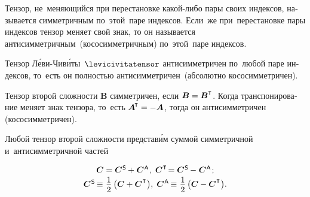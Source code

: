 \begin{otherlanguage}{russian}

Тензор, не~меняющийся при перестановке какой\hbox{-}либо пары своих индексов, называется симметричным по~этой~паре индексов. Если~же при~перестановке пары индексов тензор меняет свой знак, то он называется антисимметричным~(кососимметричным) по~этой~паре индексов.

Тензор Л\'{е}ви\hbox{-\!}Чив\'{и}ты~$\levicivitatensor$ антисимметричен по~любой паре индексов, то~есть он полностью антисимметричен~(абсолютно кососимметричен).

Тензор второй сложности ${\bm{B}}$ симметричен, если ${\bm{B} = \bm{B}^\T}$. Когда транспонирование меняет знак тензора, то~есть ${\bm{A}^{\hspace{-0.1em}\T} = - \bm{A}}$, тогда он антисимметричен (кососимметричен).

Любой тензор второй сложности представ\'{и}м суммой симметричной и~антисимметричной частей

\nopagebreak\vspace{-0.1em}\begin{equation}\begin{array}{c}
\bm{C} = \bm{C}^{\mathsf{\hspace{.1ex}S}} \hspace{-0.1ex}+\hspace{.1ex} \bm{C}^{\mathsf{\hspace{.1ex}A}}\hspace{.1ex} , \;
\bm{C}^{\hspace{.1ex}\T} \hspace{-0.33ex} = \bm{C}^{\mathsf{\hspace{.1ex}S}} \hspace{-0.1ex}-\hspace{.1ex} \bm{C}^{\mathsf{\hspace{.1ex}A}}
\hspace{.2ex} ;
\\[0.2em]
\bm{C}^{\mathsf{\hspace{.1ex}S}} \hspace{-0.22ex} \equiv \hspace{.1ex} \displaystyle \onehalf \left( {\bm{C} + \bm{C}^{\hspace{.1ex}\T}}\hspace{.1ex} \right)\!, \;
\bm{C}^{\mathsf{\hspace{.1ex}A}} \hspace{-0.22ex} \equiv \hspace{.1ex} \displaystyle \onehalf \left( {\bm{C} - \bm{C}^{\hspace{.1ex}\T}}\hspace{.1ex} \right)\!.
\end{array}\end{equation}


\end{otherlanguage}
